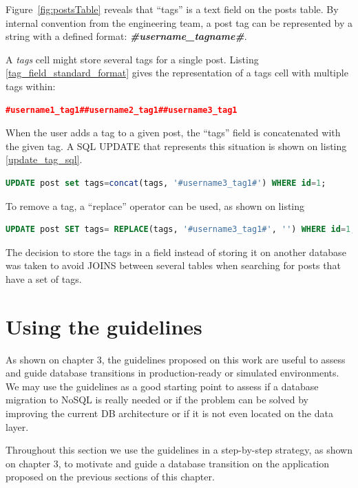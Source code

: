 Figure~\ref{fig:postsTable} reveals that ``tags'' is a text field on the posts table. By internal convention from the engineering team, a post tag can be represented by a string with a defined format: \textbf{\textit{\#username\_tagname\#}}.

A \textit{tags} cell might store several tags for a single post. Listing \ref{tag_field_standard_format} gives the representation of a tags cell with multiple tags within: 

\begin{lstlisting}[language=json,firstnumber=1, caption=Tag field standard format, label=tag_field_standard_format]
#username1_tag1##username2_tag1##username3_tag1 
\end{lstlisting}

When the user adds a tag to a given post, the ``tags'' field is concatenated with the given tag. A SQL UPDATE that represents this situation is shown on listing \ref{update_tag_sql}.

\begin{lstlisting}[language=sql,firstnumber=1, caption=Update Tag - SQL, label=update_tag_sql]
UPDATE post set tags=concat(tags, '#username3_tag1#') WHERE id=1; 
\end{lstlisting}

To remove a tag, a ``replace'' operator can be used, as shown on listing 

\begin{lstlisting}[language=sql,firstnumber=1, caption=Remove Tag - SQL, label=remove_tag_sql]
UPDATE post SET tags= REPLACE(tags, '#username3_tag1#', '') WHERE id=1; 
\end{lstlisting}

The decision to store the tags in a field instead of storing it on another database was taken to avoid JOINS between several tables when searching for posts that have a set of tags.

\section{Using the guidelines}
As shown on chapter 3, the guidelines proposed on this work are useful to assess and guide database transitions in production-ready or simulated environments. We may use the guidelines as a good starting point to assess if a database migration to NoSQL is really needed or if the problem can be solved by improving the current DB architecture or if it is not even located on the data layer.

Throughout this section we use the guidelines in a step-by-step strategy, as shown on chapter 3, to motivate and guide a database transition on the application proposed on the previous sections of this chapter. 

